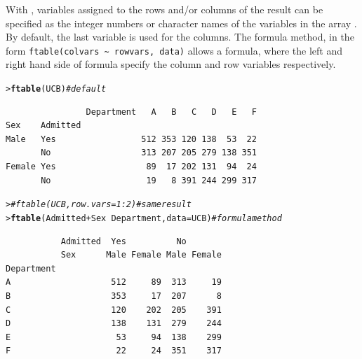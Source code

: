 \documentclass[10pt,krantz2]{krantz}\usepackage[]{graphicx}\usepackage[]{color}
\makeatletter
\newcommand{\hlcom}[1]{\textcolor[rgb]{0.678,0.584,0.686}{\textit{#1}}}%
\newcommand{\hlopt}[1]{\textcolor[rgb]{0,0,0}{#1}}%
\newcommand{\hlstd}[1]{\textcolor[rgb]{0.345,0.345,0.345}{#1}}%
\newcommand{\hlkwc}[1]{\textcolor[rgb]{0.333,0.667,0.333}{#1}}%
\newcommand{\hlkwd}[1]{\textcolor[rgb]{0.737,0.353,0.396}{\textbf{#1}}}%
\newenvironment{kframe}{%
 \def\at@end@of@kframe{}%
 \ifinner\ifhmode%
  \def\at@end@of@kframe{\end{minipage}}%
  \begin{minipage}{\columnwidth}%
 \fi\fi%
 \def\FrameCommand##1{\hskip\@totalleftmargin \hskip-\fboxsep
 \colorbox{shadecolor}{##1}\hskip-\fboxsep
     \hskip-\linewidth \hskip-\@totalleftmargin \hskip\columnwidth}%
 \MakeFramed {\advance\hsize-\width
   \@totalleftmargin\z@ \linewidth\hsize
   \@setminipage}}%
 {\par\unskip\endMakeFramed%
 \at@end@of@kframe}
\newenvironment{knitrout}{}{} %
\renewenvironment{knitrout}{\small\renewcommand{\baselinestretch}{.85}}{} %
\makeatother
\begin{document}
With , variables assigned to the rows and/or columns of the result
can be specified as the integer numbers or character names of the variables in
the array . By default, the last variable is used for the columns.
The formula method, in the form \verb|ftable(colvars ~ rowvars, data)|
allows a formula, where the left and right hand side of formula specify the column and row variables respectively.

\begin{knitrout}
\color{fgcolor}\begin{kframe}
\begin{alltt}
\hlstd{> } \hlkwd{ftable}\hlstd{(UCB)}                    \hlcom{# default}
\end{alltt}
\begin{verbatim}
                Department   A   B   C   D   E   F
Sex    Admitted                                   
Male   Yes                 512 353 120 138  53  22
       No                  313 207 205 279 138 351
Female Yes                  89  17 202 131  94  24
       No                   19   8 391 244 299 317
\end{verbatim}
\begin{alltt}
\hlstd{> }\hlcom{#ftable(UCB, row.vars = 1:2)      # same result}
\hlstd{> } \hlkwd{ftable}\hlstd{(Admitted} \hlopt{+} \hlstd{Sex} \hlopt{~} \hlstd{Department,} \hlkwc{data} \hlstd{= UCB)}   \hlcom{# formula method}
\end{alltt}
\begin{verbatim}
           Admitted  Yes          No       
           Sex      Male Female Male Female
Department                                 
A                    512     89  313     19
B                    353     17  207      8
C                    120    202  205    391
D                    138    131  279    244
E                     53     94  138    299
F                     22     24  351    317
\end{verbatim}
\end{kframe}
\end{knitrout}
\end{document}

